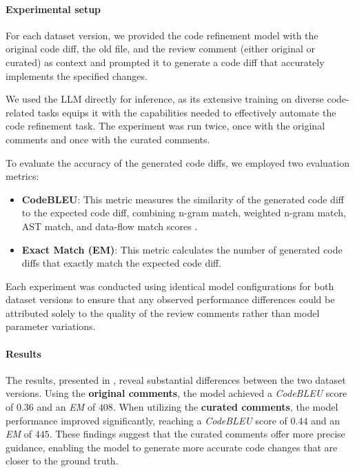 \paragraph{\textbf{Experimental setup}}
For each dataset version, we provided the code refinement model with the original code diff, the old file, and the review comment (either original or curated) as context and prompted it to generate a code diff that accurately implements the specified changes.

We used the LLM directly for inference, as its extensive training on diverse code-related tasks equips it with the capabilities needed to effectively automate the code refinement task. The experiment was run twice, once with the original comments and once with the curated comments.

To evaluate the accuracy of the generated code diffs, we employed two evaluation metrics: 
\begin{itemize} 
    \item \textbf{CodeBLEU}: This metric measures the similarity of the generated code diff to the expected code diff, combining n-gram match, weighted n-gram match, AST match, and data-flow match scores \cite{ren2020codebleu}. 
    \item \textbf{Exact Match (EM)}: This metric calculates the number of generated code diffs that exactly match the expected code diff. 
\end{itemize}

Each experiment was conducted using identical model configurations for both dataset versions to ensure that any observed performance differences could be attributed solely to the quality of the review comments rather than model parameter variations.



\paragraph{\textbf{Results}}
The results, presented in , reveal substantial differences between the two dataset versions. Using the \textbf{original comments}, the model achieved a \emph{CodeBLEU} score of $0.36$ and an \emph{EM} of $408$. When utilizing the \textbf{curated comments}, the model performance improved significantly, reaching a \emph{CodeBLEU} score of $0.44$ and an \emph{EM} of $445$. These findings suggest that the curated comments offer more precise guidance, enabling the model to generate more accurate code changes that are closer to the ground truth.

